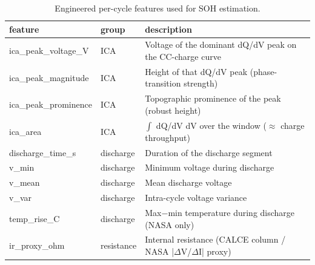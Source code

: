 \begin{table}
\caption{Engineered per-cycle features used for SOH estimation.}
\label{tab:feature_dictionary}
\begin{tabular}{lll}
\toprule
feature & group & description \\
\midrule
ica\_peak\_voltage\_V & ICA & Voltage of the dominant dQ/dV peak on the CC-charge curve \\
ica\_peak\_magnitude & ICA & Height of that dQ/dV peak (phase-transition strength) \\
ica\_peak\_prominence & ICA & Topographic prominence of the peak (robust height) \\
ica\_area & ICA & $\int$ dQ/dV dV over the window ($\approx$ charge throughput) \\
discharge\_time\_s & discharge & Duration of the discharge segment \\
v\_min & discharge & Minimum voltage during discharge \\
v\_mean & discharge & Mean discharge voltage \\
v\_var & discharge & Intra-cycle voltage variance \\
temp\_rise\_C & discharge & Max$-$min temperature during discharge (NASA only) \\
ir\_proxy\_ohm & resistance & Internal resistance (CALCE column / NASA |$\Delta$V/$\Delta$I| proxy) \\
\bottomrule
\end{tabular}
\end{table}
